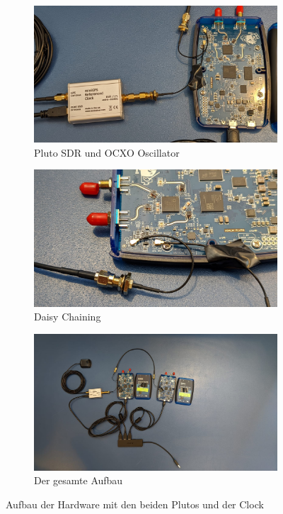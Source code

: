 \begin{figure}
    \centering
    \begin{subfigure}[Pluto mit Clock]{0.3\textwidth}
        \includegraphics[width=\textwidth]{images/Pluto_1.jpeg}
        \caption{Pluto SDR und OCXO Oscillator}
    \end{subfigure}
    \begin{subfigure}[Daisy Chaining]{0.3\textwidth}
        \includegraphics[width=\textwidth]{images/Pluto_2.jpeg}
        \caption{Daisy Chaining}
    \end{subfigure}
    \begin{subfigure}[Gesamter Aufbau]{0.3\textwidth}
        \includegraphics[width=\textwidth]{images/Pluto_4.jpeg}
        \caption{Der gesamte Aufbau}
    \end{subfigure}
    \caption{Aufbau der Hardware mit den beiden Plutos und der Clock} \label{fig:Pluto}
\end{figure}

